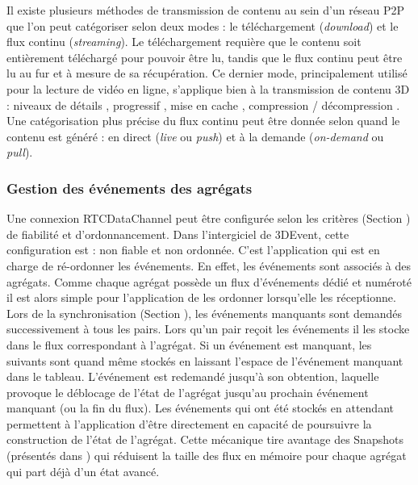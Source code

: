 Il existe plusieurs méthodes de transmission de contenu au sein d'un réseau 
\gls{P2P} que l'on peut catégoriser selon deux modes : le téléchargement 
(\textit{download}) 
et le flux continu (\textit{streaming}). Le téléchargement requière que le contenu 
soit entièrement téléchargé pour pouvoir être lu, tandis que le flux continu peut 
être lu au fur et à mesure de sa récupération. Ce dernier mode, principalement 
utilisé pour la lecture de vidéo en ligne, s'applique bien à la transmission de 
contenu \gls{3D} : niveaux de détails \cite{Chu2012,Hu2008}, progressif 
\cite{Cheng2009,Limper2014}, mise en cache \cite{Jia2014}, compression / 
décompression
\cite{Lavoue2013,Ponchio2015,Maglo2013a}. 
Une catégorisation plus précise du flux continu peut être donnée selon quand le 
contenu est généré : 
en direct (\textit{live} ou \textit{push}) et à la demande (\textit{on-demand} ou 
\textit{pull}).  



\subsubsection{Gestion des événements des agrégats}

Une connexion RTCDataChannel peut être configurée selon 
les critères (Section ) de fiabilité et d'ordonnancement. 
Dans l'intergiciel de 3DEvent, cette configuration est : non fiable et non ordonnée. 
C'est l'application qui est en charge de \og ré-ordonner\fg{} les événements. En 
effet, les événements sont associés à des agrégats. Comme chaque agrégat 
possède un flux d'événements dédié et numéroté il est alors simple pour 
l'application de les 
ordonner lorsqu'elle les réceptionne. 
Lors de la synchronisation (Section ), les 
événements manquants sont demandés successivement à tous les pairs. Lors 
qu'un pair reçoit les événements il les stocke dans le flux correspondant à 
l'agrégat. Si un événement est manquant, les suivants sont quand même stockés 
en laissant l'espace de l'événement manquant dans le tableau. L'événement est 
redemandé jusqu'à son obtention, laquelle provoque le déblocage de l'état de 
l'agrégat jusqu'au prochain événement manquant (ou la fin du flux). Les 
événements qui ont été stockés \og en attendant\fg{} permettent à l'application 
d'être directement en capacité de poursuivre la construction de l'état de l'agrégat. 
Cette mécanique tire avantage des Snapshots (présentés dans ) 
qui réduisent la taille des flux en mémoire pour chaque agrégat qui part déjà d'un 
état avancé.


